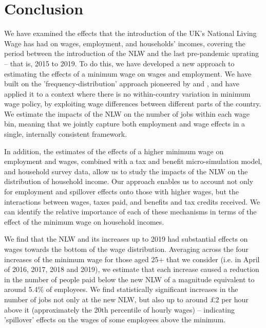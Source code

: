 
\section{Conclusion} \label{sec:conclusion}

We have examined the effects that the introduction of the UK's National Living Wage  has had on wages, employment, and households’ incomes, covering the period between the introduction of the NLW and the last pre-pandemic uprating -- that is, 2015 to 2019.  To do this, we have developed a new approach to estimating the effects of a minimum wage on wages and employment. We have built on the 'frequency-distribution' approach pioneered  by \cite{Harasztosi2019} and \cite{Cengiz2019}, and have applied it to a context where there is no within-country variation in minimum wage policy, by exploiting wage differences between different parts of the country. We  estimate the impacts of the NLW on the number of jobs within each wage bin, meaning that we jointly capture both employment and wage effects in a single, internally consistent framework.  \par

In addition, the estimates of the effects of a higher minimum wage on employment and wages, combined with a tax and benefit micro-simulation model, and household survey data, allow us to study the impacts of the NLW on the distribution of household income. Our approach enables us to account not only for employment and spillover effects onto those with higher wages, but the interactions between wages, taxes paid, and benefits and tax credits received. We can identify the relative importance of each of these mechanisms in terms of the effect of the minimum wage on household incomes. 


We find that the NLW and its increases up to 2019 had substantial effects on wages towards the bottom of the wage distribution. Averaging across the four increases of the minimum wage for those aged 25+ that we consider (i.e. in April of 2016, 2017, 2018 and 2019), we estimate that each increase caused a reduction in the number of people paid below the new NLW of a magnitude equivalent to around 5.4\% of employees. We find statistically significant increases in the number of jobs not only at the new NLW, but also up to around \pounds 2 per hour above it (approximately the 20th percentile of hourly wages) -- indicating 'spillover' effects on the wages of some employees above the minimum. \par

